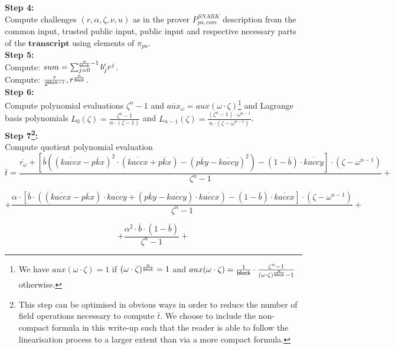 \noindent \textbf{Step 4:} \\
\noindent Compute challenges $(r, \alpha, \zeta, \nu, u)$ as in the prover $P_{\mathit{pa, com}}^{\mathit{SNARK}}$ description from the common input, trusted public input, public input and respective necessary parts of the $\mathbf{transcript}$ using elements of $\pi_{\mathit{pa}}$. \\

\noindent \textbf{Step 5:} \\
\noindent Compute: $sum = \sum_{j=0}^{\frac{n}{\mathsf{block}}-1} b'_{j} r^j$. \\

\noindent Compute: $\frac{r}{2^{\mathsf{block} -1}}, r^{\frac{n}{\mathsf{block}}}$. \\

\noindent \textbf{Step 6:} \\
\noindent Compute polynomial evaluations $\zeta^{n} -1$ and $\overline{aux}_{\omega} = aux(\omega \cdot \zeta)$\footnote{We have $aux(\omega \cdot \zeta)= 1$ if $(\omega\cdot \zeta)^{\frac{n}{\mathsf{block}}} =1$ and $aux(\omega \cdot \zeta) = \frac{1}{\mathsf{block}} \cdot \frac{\zeta^n -1}{(\omega\cdot\zeta)^{\frac{n}{\mathsf{block}}} -1}$ otherwise.} and Lagrange basis polynomials 
$L_0(\zeta)= \frac{\zeta^n - 1}{n \cdot (\zeta-1)}$ and $L_{n-1}(\zeta)= \frac{(\zeta^n - 1) \cdot \omega^{n-1}}{n \cdot (\zeta - \omega^{n-1})}$. \\

\noindent \textbf{Step 7\footnote{This step can be optimised in obvious ways in order to reduce the number of field operations necessary to compute $\bar{t}$. We choose to include the non-compact formula in this write-up such that the reader is able to follow the linearisation process to a larger extent than via a more compact formula.}:} \\
\noindent Compute quotient polynomial evaluation $$\bar{t} = 
\frac{\overline{r_{\omega}} + [\bar{b}((\overline{kaccx} - \overline{pkx})^2 \cdot (\overline{kaccx} + \overline{pkx})- (\overline{pky} - \overline{kaccy})^2) - (1-\bar{b})\cdot \overline{kaccy}]\cdot (\zeta - \omega^{n-1})}{\zeta^{n} - 1} +$$

$$+ \frac{\alpha \cdot [\bar{b} \cdot ((\overline{kaccx} - \overline{pkx}) \cdot \overline{kaccy} + (\overline{pky} - \overline{kaccy}) \cdot \overline{kaccx}) - (1 - \bar{b}) \cdot \overline{kaccx}] \cdot (\zeta - \omega^{n-1})}{\zeta^{n} - 1}+$$

$$+\frac{\alpha^2 \cdot \bar{b} \cdot (1 - \bar{b})}{\zeta^{n} - 1} +$$

